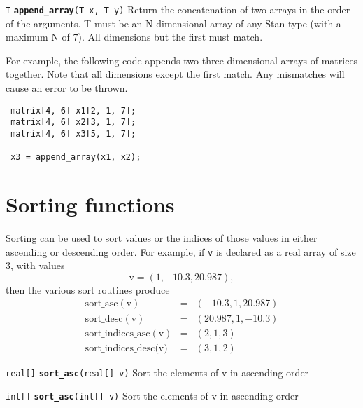 \documentclass[
  10pt,
]{book}
\begin{document}

\texttt{T} \textbf{\texttt{append\_array}}\texttt{(T\ x,\ T\ y)}\newline
Return the concatenation of two arrays in the order of the arguments.
T must be an N-dimensional array of any Stan type (with a maximum N of
7). All dimensions but the first must match.

For example, the following code appends two three dimensional arrays
of matrices together. Note that all dimensions except the first match.
Any mismatches will cause an error to be thrown.

\begin{verbatim}
 matrix[4, 6] x1[2, 1, 7];
 matrix[4, 6] x2[3, 1, 7];
 matrix[4, 6] x3[5, 1, 7];
 
 x3 = append_array(x1, x2);
\end{verbatim}

\hypertarget{sorting-functions}{%
\section{Sorting functions}\label{sorting-functions}}

Sorting can be used to sort values or the indices of those values in
either ascending or descending order. For example, if \texttt{v} is declared
as a real array of size 3, with values \[ \text{v} = (1, -10.3,
20.987), \] then the various sort routines produce \begin{eqnarray*}
\mathrm{sort\_asc(v)} & = &  (-10.3,1,20.987) \\[4pt]
\mathrm{sort\_desc(v)} & = &  (20.987,1,-10.3) \\[4pt]
\mathrm{sort\_indices\_asc(v)} & = &  (2,1,3) \\[4pt]
\text{sort\_indices\_desc(v)} & = &  (3,1,2) \end{eqnarray*}


\texttt{real{[}{]}} \textbf{\texttt{sort\_asc}}\texttt{(real{[}{]}\ v)}\newline
Sort the elements of v in ascending order


\texttt{int{[}{]}} \textbf{\texttt{sort\_asc}}\texttt{(int{[}{]}\ v)}\newline
Sort the elements of v in ascending order
\end{document}
